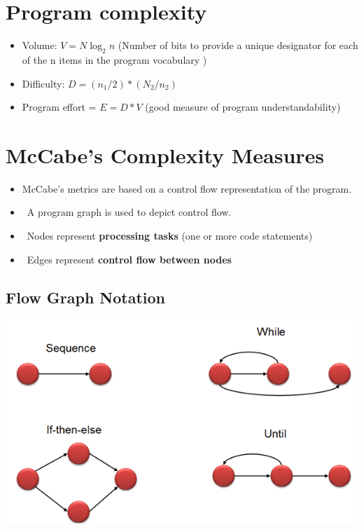 \documentclass{article}
\begin{document}
\section{Program complexity}

\begin{itemize}
  \item Volume: $V = N \log_2 n$ (Number	of	bits	to	provide	a	unique	designator	for	each	of	the	n	items	in	the	program	vocabulary
)
  \item Difficulty: $D = (n_{1} / 2) * (N_{2} / n_{2})$
  \item Program effort = $E = D * V$ (good	measure	of	program	understandability)
\end{itemize}

\section{McCabe’s Complexity Measures}

\begin{itemize}
  \item McCabe’s	metrics	are	based	on	a	control	flow	representation	of	the	program.	
  \item  A	program	graph	is	used	to	depict	control	flow.	
  \item  Nodes	represent	\textbf{processing	tasks}	(one	or	more	code	statements)	
  \item  Edges	represent	\textbf{control	flow	between	nodes}
\end{itemize}

\subsection{Flow Graph Notation}

\begin{center}
  \includegraphics[scale=0.5]{mccabe_flow.png}
\end{center}
\end{document}
